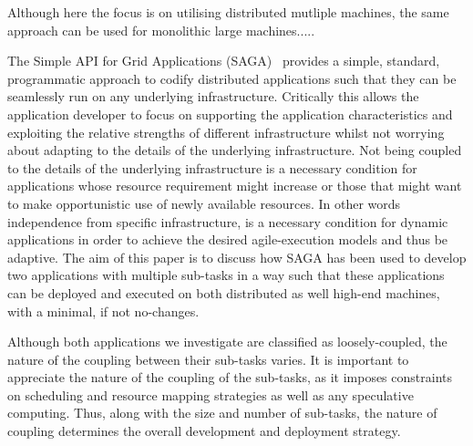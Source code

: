 \documentclass{llncs}
\begin{document}
Although here the focus is on utilising distributed mutliple machines,
the same approach can be used for monolithic large machines.....




The Simple API for Grid Applications (SAGA)~\cite{saga_url}
provides a simple, standard, programmatic approach to codify
distributed applications such that they can be seamlessly run on any
underlying infrastructure. Critically this allows the application
developer to focus on supporting the application characteristics and
exploiting the relative strengths of different infrastructure whilst
not worrying about adapting to the details of the underlying
infrastructure. Not being coupled to the details of the underlying
infrastructure is a necessary condition for applications whose
resource requirement might increase or those that might want to make
opportunistic use of newly available resources. In other words
independence from specific infrastructure, is a necessary condition
for dynamic applications in order to achieve the desired
agile-execution models and thus be adaptive.  The aim of this paper is
to discuss how SAGA has been used to develop two applications with
multiple sub-tasks in a way such that these applications can be
deployed and executed on both distributed as well high-end machines,
with a minimal, if not no-changes.


Although both applications we investigate are classified as
loosely-coupled, the nature of the coupling between their sub-tasks
varies. It is important to appreciate the nature of the coupling of
the sub-tasks, as it imposes constraints on scheduling and resource
mapping strategies as well as any speculative computing.  Thus, along
with the size and number of sub-tasks, the nature of coupling
determines the overall development and deployment strategy.

\end{document}
